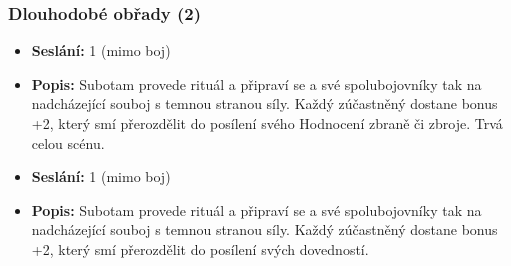 \documentclass[../main.tex]{subfiles}
\begin{document}
\subsubsection{Dlouhodobé obřady (2)}

\begin{specialita}
\begin{itemize}
	\item \textbf{Seslání:} 1 (mimo boj)
	\item \textbf{Popis:} Subotam provede rituál a připraví se a své spolubojovníky tak na nadcházející souboj s temnou stranou síly. Každý zúčastněný dostane bonus +2, který smí přerozdělit do posílení svého Hodnocení zbraně či zbroje. Trvá celou scénu.
\end{itemize}
\end{specialita}

\begin{specialita}
\begin{itemize}
	\item \textbf{Seslání:} 1 (mimo boj)
	\item \textbf{Popis:} Subotam provede rituál a připraví se a své spolubojovníky tak na nadcházející souboj s temnou stranou síly. Každý zúčastněný dostane bonus +2, který smí přerozdělit do posílení svých dovedností.
\end{itemize}
\end{specialita}
\end{document}
